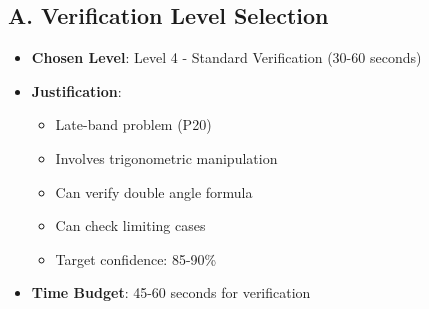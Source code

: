 \documentclass[12pt]{article}
\begin{document}
\begin{verificationbox}
\subsection*{A. Verification Level Selection}
\begin{itemize}[leftmargin=*]
    \item \textbf{Chosen Level}: Level 4 - Standard Verification (30-60 seconds)
    \item \textbf{Justification}: 
    \begin{itemize}
        \item Late-band problem (P20)
        \item Involves trigonometric manipulation
        \item Can verify double angle formula
        \item Can check limiting cases
        \item Target confidence: 85-90\%
    \end{itemize}
    \item \textbf{Time Budget}: 45-60 seconds for verification
\end{itemize}


\end{verificationbox}
\end{document}
